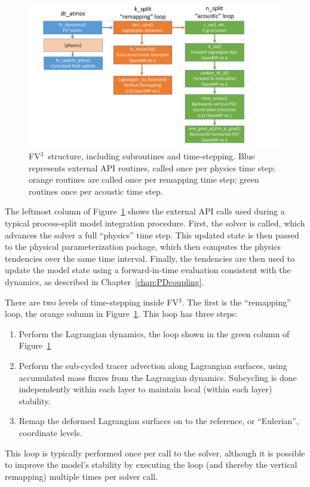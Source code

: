 \documentclass[12pt,letterpaper]{book}
\newcommand{\fv}{FV$^{\mathrm{3}}$}
\begin{document}
\begin{figure}[t] %
   \centering
   \includegraphics[scale=0.5]{FV3flowchart.pdf} 
   \caption{\fv\ structure, including subroutines and time-stepping. Blue represents external API routines, called once per physics time step; orange routines are called once per remapping time step; green routines once per acoustic time step.}
   \label{fig:flowchart}
\end{figure}


The leftmost column of Figure~\ref{fig:flowchart} shows the external API calls used during a typical process-split model integration procedure. First, the solver is called, which advances the solver a full ``physics'' time step. This updated state is then passed to the physical parameterization package, which then computes the physics tendencies over the same time interval. Finally, the tendencies are then used to update the model state using a forward-in-time evaluation consistent with the dynamics, as described in Chapter~\ref{chap:PDcoupling}.

There are two levels of time-stepping inside \fv. The first is the ``remapping'' loop, the orange column in Figure~\ref{fig:flowchart}. This loop has three steps:
\begin{enumerate}
 \item Perform the Lagrangian dynamics, the loop shown in the green column of Figure~\ref{fig:flowchart}
 \item Perform the sub-cycled tracer advection along Lagrangian surfaces, using accumulated mass fluxes from the Lagrangian dynamics. Subcycling is done independently within each layer to maintain local (within each layer) stability.  %
 \item Remap the deformed Lagrangian surfaces on to the reference, or ``Eulerian'', coordinate levels. 
\end{enumerate}
This loop is typically performed once per call to the solver, although it is possible to improve the model's stability by executing the loop (and thereby the vertical remapping) multiple times per solver call. 
\end{document}
